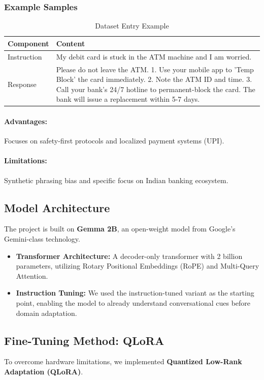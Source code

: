 \documentclass[12pt,a4paper]{article}
\begin{document}
\subsubsection{Example Samples}
\begin{table}[H]
    \centering
    \caption{Dataset Entry Example}
    \begin{tabular}{lp{10cm}}
        \toprule
        \textbf{Component} & \textbf{Content} \\
        \midrule
        Instruction & My debit card is stuck in the ATM machine and I am worried. \\
        Response & Please do not leave the ATM. 1. Use your mobile app to 'Temp Block' the card immediately. 2. Note the ATM ID and time. 3. Call your bank's 24/7 hotline to permanent-block the card. The bank will issue a replacement within 5-7 days. \\
        \bottomrule
    \end{tabular}
\end{table}

\paragraph{Advantages:} Focuses on safety-first protocols and localized payment systems (UPI).
\paragraph{Limitations:} Synthetic phrasing bias and specific focus on Indian banking ecosystem.

\subsection{Model Architecture}
The project is built on \textbf{Gemma 2B}, an open-weight model from Google's Gemini-class technology.

\begin{itemize}
    \item \textbf{Transformer Architecture:} A decoder-only transformer with 2 billion parameters, utilizing Rotary Positional Embeddings (RoPE) and Multi-Query Attention.
    \item \textbf{Instruction Tuning:} We used the instruction-tuned variant as the starting point, enabling the model to already understand conversational cues before domain adaptation.
\end{itemize}

\subsection{Fine-Tuning Method: QLoRA}
To overcome hardware limitations, we implemented \textbf{Quantized Low-Rank Adaptation (QLoRA)}.
\end{document}
